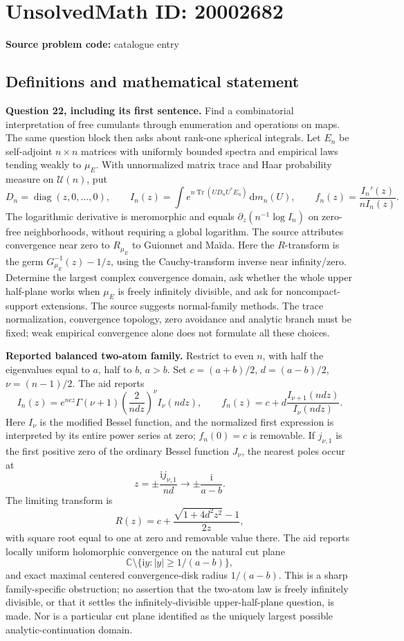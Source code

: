 \documentclass[11pt]{article}
\newcommand{\C}{\mathbb{C}}
\begin{document}
\section*{UnsolvedMath ID: 20002682}
\textbf{Source problem code:} catalogue entry
\subsection{Definitions and mathematical statement}
\textbf{Question 22, including its first sentence.} Find a combinatorial interpretation of free cumulants through enumeration and operations on maps. The same question block then asks about rank-one spherical integrals. Let \(E_n\) be self-adjoint \(n\times n\) matrices with uniformly bounded spectra and empirical laws tending weakly to \(\mu_E\). With unnormalized matrix trace and Haar probability measure on \(\mathcal U(n)\), put
\[
 D_n=\operatorname{diag}(z,0,\ldots,0),\qquad
 I_n(z)=\int e^{n\operatorname{Tr}(UD_nU^*E_n)}\,\mathrm dm_n(U),
 \qquad f_n(z)=\frac{I_n'(z)}{nI_n(z)}.
\]
The logarithmic derivative is meromorphic and equals \(\partial_z(n^{-1}\log I_n)\) on zero-free neighborhoods, without requiring a global logarithm. The source attributes convergence near zero to \(R_{\mu_E}\) to Guionnet and Ma\"ida. Here the \(R\)-transform is the germ \(G_{\mu_E}^{-1}(z)-1/z\), using the Cauchy-transform inverse near infinity/zero. Determine the largest complex convergence domain, ask whether the whole upper half-plane works when \(\mu_E\) is freely infinitely divisible, and ask for noncompact-support extensions. The source suggests normal-family methods. The trace normalization, convergence topology, zero avoidance and analytic branch must be fixed; weak empirical convergence alone does not formulate all these choices.

\textbf{Reported balanced two-atom family.} Restrict to even \(n\), with half the eigenvalues equal to \(a\), half to \(b\), \(a>b\). Set \(c=(a+b)/2\), \(d=(a-b)/2\), \(\nu=(n-1)/2\). The aid reports
\[
 I_n(z)=e^{ncz}\Gamma(\nu+1)
 \left(\frac2{ndz}\right)^\nu I_\nu(ndz),\qquad
 f_n(z)=c+d\frac{I_{\nu+1}(ndz)}{I_\nu(ndz)}.
\]
Here \(I_\nu\) is the modified Bessel function, and the normalized first expression is interpreted by its entire power series at zero; \(f_n(0)=c\) is removable. If \(j_{\nu,1}\) is the first positive zero of the ordinary Bessel function \(J_\nu\), the nearest poles occur at
\[
 z=\pm\frac{\mathrm i j_{\nu,1}}{nd}
 \longrightarrow\pm\frac{\mathrm i}{a-b}.
\]
The limiting transform is
\[
 R(z)=c+\frac{\sqrt{1+4d^2z^2}-1}{2z},
\]
with square root equal to one at zero and removable value there. The aid reports locally uniform holomorphic convergence on the natural cut plane
\[
 \C\setminus\{\mathrm i y:|y|\geq1/(a-b)\},
\]
and exact maximal centered convergence-disk radius \(1/(a-b)\). This is a sharp family-specific obstruction; no assertion that the two-atom law is freely infinitely divisible, or that it settles the infinitely-divisible upper-half-plane question, is made. Nor is a particular cut plane identified as the uniquely largest possible analytic-continuation domain.
\end{document}

